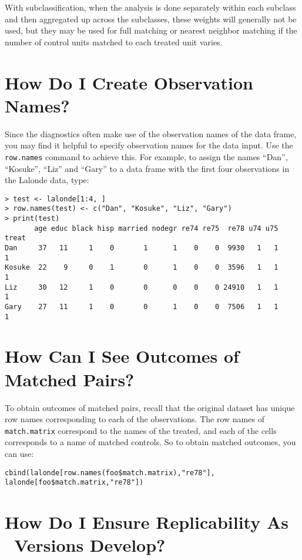 With subclassification, when the analysis is done separately within
each subclass and then aggregated up across the subclasses, these
weights will generally not be used, but they may be used for full
matching or nearest neighbor matching if the number of control units
matched to each treated unit varies.



\section{How Do I Create Observation Names?}
\label{rnames}

Since the diagnostics often make use of the observation names of the
data frame, you may find it helpful to specify observation names for
the data input.  Use the \texttt{row.names} command to achieve this.
For example, to assign the names ``Dan'', ``Kosuke'', ``Liz'' and
``Gary'' to a data frame with the first four observations in the
Lalonde data, type:


\begin{verbatim}
> test <- lalonde[1:4, ]
> row.names(test) <- c("Dan", "Kosuke", "Liz", "Gary")
> print(test)
       age educ black hisp married nodegr re74 re75  re78 u74 u75 treat
Dan     37   11     1    0       1      1    0    0  9930   1   1     1
Kosuke  22    9     0    1       0      1    0    0  3596   1   1     1
Liz     30   12     1    0       0      0    0    0 24910   1   1     1
Gary    27   11     1    0       0      1    0    0  7506   1   1     1
\end{verbatim}

\section{How Can I See Outcomes of Matched Pairs?}

To obtain outcomes of matched pairs, recall that the original dataset has unique row names corresponding to each of
the observations.  The row names of \texttt{match.matrix} correspond to the names of the treated, and each
of the cells corresponds to a name of matched controls.  So to obtain matched outcomes, you can use:

\begin{verbatim}
cbind(lalonde[row.names(foo$match.matrix),"re78"], lalonde[foo$match.matrix,"re78"])
\end{verbatim}

\section{How Do I Ensure Replicability As \MatchIt\ Versions Develop?}
\label{subsec:vercontrol}

